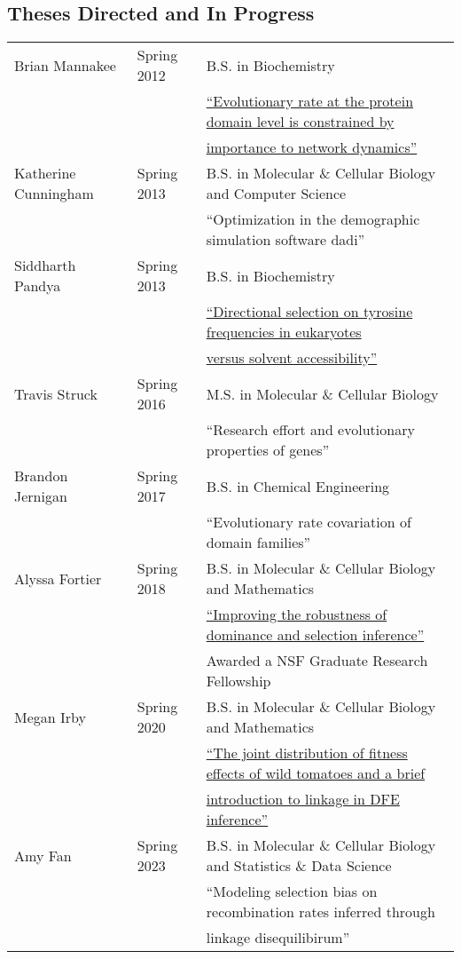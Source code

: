 \documentclass[11pt]{article}
\newcommand{\dadi}{dadi\xspace}
\begin{document}

\subsection*{Theses Directed and In Progress}
\begin{longtable}[l]{l l l}
Brian Mannakee & Spring 2012 & B.S. in Biochemistry\\
 & & \href{http://hdl.handle.net/10150/244452}{``Evolutionary rate at the protein domain level is constrained by}\\
&& \href{http://hdl.handle.net/10150/244452}{importance to network dynamics''}\\
Katherine Cunningham & Spring 2013 & B.S. in Molecular \& Cellular Biology and Computer Science\\
 && ``Optimization in the demographic simulation software  \dadi''\\
 Siddharth Pandya & Spring 2013 & B.S. in Biochemistry\\
 && \href{http://hdl.handle.net/10150/297727}{``Directional selection on tyrosine frequencies in eukaryotes}\\
 &&\href{http://hdl.handle.net/10150/297727}{versus solvent accessibility''}\\
 Travis Struck & Spring 2016 & M.S. in Molecular \& Cellular Biology\\
                    & & ``Research effort and evolutionary properties of genes''\\
Brandon Jernigan & Spring 2017 & B.S. in Chemical Engineering\\
& & ``Evolutionary rate covariation of domain families''\\
Alyssa Fortier & Spring 2018 & B.S. in Molecular \& Cellular Biology and Mathematics\\
&& \href{http://hdl.handle.net/10150/630373}{``Improving the robustness of dominance and selection inference''}\\
&& Awarded a NSF Graduate Research Fellowship\\
Megan Irby & Spring 2020 & B.S. in Molecular \& Cellular Biology and Mathematics\\
&& \href{https://repository.arizona.edu/handle/10150/651036}{``The joint distribution of fitness effects of wild tomatoes and a brief}\\
&& \href{https://repository.arizona.edu/handle/10150/651036}{introduction to linkage in DFE inference''}\\
Amy Fan & Spring 2023 & B.S. in Molecular \& Cellular Biology and Statistics \& Data Science\\
&&``Modeling selection bias on recombination rates inferred through\\
&& linkage disequilibirum''
\end{longtable}
\end{document}
